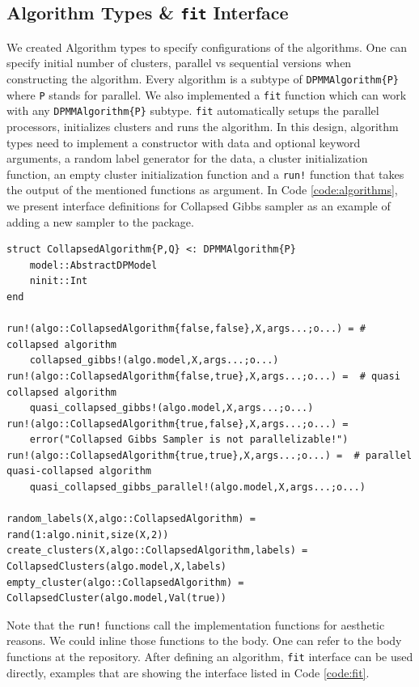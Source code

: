 \documentclass[12pt, a4paper]{article}
\newenvironment{code}{\captionsetup{type=listing}}{}
\begin{document}
\subsection{Algorithm Types \& \texttt{fit} Interface}

We created Algorithm types to specify configurations of the algorithms. One can specify initial number of clusters, parallel vs sequential versions when constructing the algorithm. Every algorithm is a subtype of \texttt{DPMMAlgorithm\{P\}} where \texttt{P} stands for parallel. We also implemented a \texttt{fit} function which can work with any \texttt{DPMMAlgorithm\{P\}} subtype. \texttt{fit} automatically setups the parallel processors, initializes clusters and runs the algorithm. In this design, algorithm types need to implement a constructor with data and optional keyword arguments, a random label generator for the data, a cluster initialization function, an empty cluster initialization function and a \texttt{run!} function that takes the output of the mentioned functions as argument. In Code \ref{code:algorithms}, we present interface definitions for Collapsed Gibbs sampler as an example of adding a new sampler to the package.


\begin{code}
\begin{verbatim}
struct CollapsedAlgorithm{P,Q} <: DPMMAlgorithm{P}
    model::AbstractDPModel
    ninit::Int
end

run!(algo::CollapsedAlgorithm{false,false},X,args...;o...) = # collapsed algorithm
    collapsed_gibbs!(algo.model,X,args...;o...)
run!(algo::CollapsedAlgorithm{false,true},X,args...;o...) =  # quasi collapsed algorithm
    quasi_collapsed_gibbs!(algo.model,X,args...;o...)
run!(algo::CollapsedAlgorithm{true,false},X,args...;o...) =
    error("Collapsed Gibbs Sampler is not parallelizable!")
run!(algo::CollapsedAlgorithm{true,true},X,args...;o...) =  # parallel quasi-collapsed algorithm
    quasi_collapsed_gibbs_parallel!(algo.model,X,args...;o...)

random_labels(X,algo::CollapsedAlgorithm) = rand(1:algo.ninit,size(X,2))
create_clusters(X,algo::CollapsedAlgorithm,labels) = CollapsedClusters(algo.model,X,labels)
empty_cluster(algo::CollapsedAlgorithm) = CollapsedCluster(algo.model,Val(true))
\end{verbatim}
\label{code:algorithms}
\end{code}

Note that the \texttt{run!} functions call the implementation functions for aesthetic reasons. We could inline those functions to the body. One can refer to the body functions at the repository. After defining an algorithm, \texttt{fit} interface can be used directly, examples that are showing the interface listed in Code \ref{code:fit}.
\end{document}
